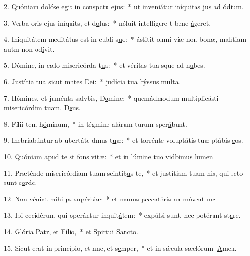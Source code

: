 2. Quóniam dolóse egit in conspctu \uline{e}jus:~* ut inveniátur iníquitas jus ad \uline{ó}dium.\par 
3. Verba oris ejus iníquits, et d\uline{o}lus:~* nóluit intellígere t bene \uline{á}geret.\par 
4. Iniquitátem meditátus est in cubli s\uline{u}o:~* ástitit omni viæ non bonæ, malítiam autm non od\uline{í}vit.\par 
5. Dómine, in cælo misericórda t\uline{u}a:~* et véritas tua sque ad n\uline{u}bes.\par 
6. Justítia tua sicut mntes D\uline{e}i:~* judícia tua býssus m\uline{u}lta.\par 
7. Hómines, et juménta salvbis, D\uline{ó}mine:~* quemádmodum multiplicásti misericórdim tuam, D\uline{e}us,\par 
8. Fílii tem h\uline{ó}minum,~* in tégmine alárum turum sper\uline{á}bunt.\par 
9. Inebriabúntur ab ubertáte dmus t\uline{u}æ:~* et torrénte voluptátis tuæ ptábis \uline{e}os.\par 
10. Quóniam apud te st fons v\uline{i}tæ:~* et in lúmine tuo vidbimus l\uline{u}men.\par 
11. Præténde misericórdiam tuam scintib\uline{u}s te,~* et justítiam tuam his, qui rcto sunt c\uline{o}rde.\par 
12. Non véniat mihi ps sup\uline{é}rbiæ:~* et manus peccatóris nn móve\uline{a}t me.\par 
13. Ibi cecidérunt qui operántur inquit\uline{á}tem:~* expúlsi sunt, nec potérunt st\uline{a}re.\par 
14. Glória Patr, et F\uline{í}lio,~* et Spirtui S\uline{a}ncto.\par 
15. Sicut erat in princípio, et nnc, et s\uline{e}mper,~* et in sǽcula sæclórum. \uline{A}men.\par 
